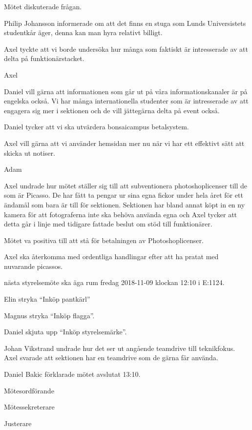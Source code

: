 \documentclass[10pt]{article}
\def\mo{Daniel Bakic}
\def\ms{Axel Voss}
\def\ji{Elin Johansson}
\begin{document}
\begin{paragrafer}
	Mötet diskuterade frågan. 

	Philip Johansson informerade om att det finns en stuga som Lunds Universistets studentkår äger, denna kan man hyra relativt billigt. 
	
	Axel tyckte att vi borde undersöka hur många som faktiskt är intresserade av att delta på funktionärstacket.

	Axel 

	\Mbaby


	Daniel vill gärna att informationen som går ut på våra informationskanaler är på engelska också. Vi har många internationella studenter som är intresserade av att engagera sig mer i sektionen och de vill jättegärna delta på event också. 

	Daniel tycker att vi ska utvärdera bonsaicampus betalsystem. 

	Axel vill gärna att vi använder hemsidan mer nu när vi har ett effektivt sätt att skicka ut notiser. 
	
	Adam 

	\Mbaby


	Axel undrade hur mötet ställer sig till att subventionera photoshoplicenser till de som är Picasso.
	De har fått ta pengar ur sina egna fickor under hela året för ett ändamål som bara är till för sektionen.
	Sektionen har bland annat köpt in en ny kamera för att fotograferna inte ska behöva använda egna och Axel tycker att detta går i linje med tidigare fattade beslut om stöd till funktionärer.
	
	\Mdf

	Mötet va positiva till att stå för betalningen av Photoshoplicenser.

	Axel ska återkomma med ordentliga handlingar efter att ha pratat med nuvarande picassos. 


	\Mba nästa styrelsemöte ska äga rum fredag 2018-11-09 klockan 12:10 i E:1124.


	Elin \ypa stryka ``Inköp pantkärl''

	Magnus \ypa stryka ``Inköp flagga''.

	Daniel \ypa skjuta upp ``Inköp styrelsemärke''.

	\Mbabay


	Johan Vikstrand undrade hur det ser ut angående teamdrive till teknikfokus. Axel svarade att sektionen har en teamdrive som de gärna får använda.

	
	{\mo} förklarade mötet avslutat 13:10.

\end{paragrafer}

\hidesignfoot
\begin{signatures}{3}
	\signature{\mo}{Mötesordförande}
	\signature{\ms}{Mötessekreterare}
	\signature{\ji}{Justerare}
\end{signatures}
\end{document}
